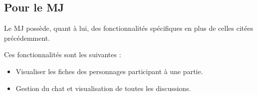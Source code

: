 \documentclass[11pt,a4paper]{article}
\begin{document}
\subsection{Pour le MJ}
Le MJ possède, quant à lui, des fonctionnalités spécifiques en plus de celles
citées précédemment.

Ces fonctionnalités sont les suivantes :

\begin{itemize}
  \item Visualiser les fiches des personnages participant à une partie.
  \item Gestion du chat et visualisation de toutes les discussions.
\end{itemize}

\clearpage
  
\end{document}
